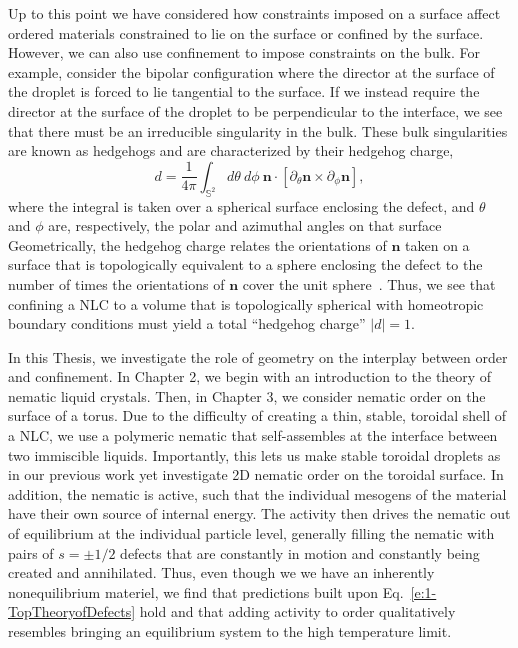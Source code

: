 Up to this point we have considered how constraints imposed on a surface affect ordered materials constrained to lie on the surface or confined by the surface.
However, we can also use confinement to impose constraints on the bulk.
For example, consider the bipolar configuration where the director at the surface of the droplet is forced to lie tangential to the surface.
If we instead require the director at the surface of the droplet to be perpendicular to the interface, we see that there must be an irreducible singularity in the bulk.
These bulk singularities are known as hedgehogs and are characterized by their hedgehog charge,
\begin{equation}
  d = \frac{1}{4 \pi} \int_{\mathbb{S}^2} d\theta \: d\phi \: \mathbf{n} \cdot \left [ \partial_{\theta} \mathbf{n} \times \partial_{\phi} \mathbf{n} \right ],\label{e:1-HedgehogCharge}
\end{equation}
where the integral is taken over a spherical surface enclosing the defect, and $\theta$ and $\phi$ are, respectively, the polar and azimuthal angles on that surface~\cite{RN153}
Geometrically, the hedgehog charge relates the orientations of $\mathbf{n}$ taken on a surface that is topologically equivalent to a sphere enclosing the defect to the number of times the orientations of $\mathbf{n}$ cover the unit sphere~\cite{RN153}.
Thus, we see that confining a NLC to a volume that is topologically spherical with homeotropic boundary conditions must yield a total ``hedgehog charge'' $|d|=1$.

In this Thesis, we investigate the role of geometry on the interplay between order and confinement.
In Chapter 2, we begin with an introduction to the theory of nematic liquid crystals.
Then, in Chapter 3, we consider nematic order on the surface of a torus.
Due to the difficulty of creating a thin, stable, toroidal shell of a NLC, we use a polymeric nematic that self-assembles at the interface between two immiscible liquids.
Importantly, this lets us make stable toroidal droplets as in our previous work yet investigate 2D nematic order on the toroidal surface.
In addition, the nematic is active, such that the individual mesogens of the material have their own source of internal energy.
The activity then drives the nematic out of equilibrium at the individual particle level, generally filling the nematic with pairs of $s = \pm 1/2$ defects that are constantly in motion and constantly being created and annihilated.
Thus, even though we we have an inherently nonequilibrium materiel, we find that predictions built upon Eq.~\ref{e:1-TopTheoryofDefects} hold and that adding activity to order qualitatively resembles bringing an equilibrium system to the high temperature limit.

